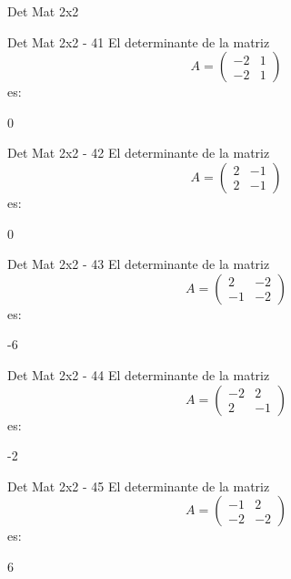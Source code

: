 \documentclass[a4,11pt]{aleph-notas}
\begin{document}
\begin{quiz}{Det Mat 2x2}
\begin{numerical}[tolerance=0]%
    {Det Mat 2x2 - 41}
    El determinante de la matriz
    \[
        A = \begin{pmatrix} -2 & 1 \\ -2 & 1 \end{pmatrix}
    \]
    es:
    \item[] 0
\end{numerical}

\begin{numerical}[tolerance=0]%
    {Det Mat 2x2 - 42}
    El determinante de la matriz
    \[
        A = \begin{pmatrix} 2 & -1 \\ 2 & -1 \end{pmatrix}
    \]
    es:
    \item[] 0
\end{numerical}

\begin{numerical}[tolerance=0]%
    {Det Mat 2x2 - 43}
    El determinante de la matriz
    \[
        A = \begin{pmatrix} 2 & -2 \\ -1 & -2 \end{pmatrix}
    \]
    es:
    \item[] -6
\end{numerical}

\begin{numerical}[tolerance=0]%
    {Det Mat 2x2 - 44}
    El determinante de la matriz
    \[
        A = \begin{pmatrix} -2 & 2 \\ 2 & -1 \end{pmatrix}
    \]
    es:
    \item[] -2
\end{numerical}

\begin{numerical}[tolerance=0]%
    {Det Mat 2x2 - 45}
    El determinante de la matriz
    \[
        A = \begin{pmatrix} -1 & 2 \\ -2 & -2 \end{pmatrix}
    \]
    es:
    \item[] 6
\end{numerical}


\end{quiz}
\end{document}
